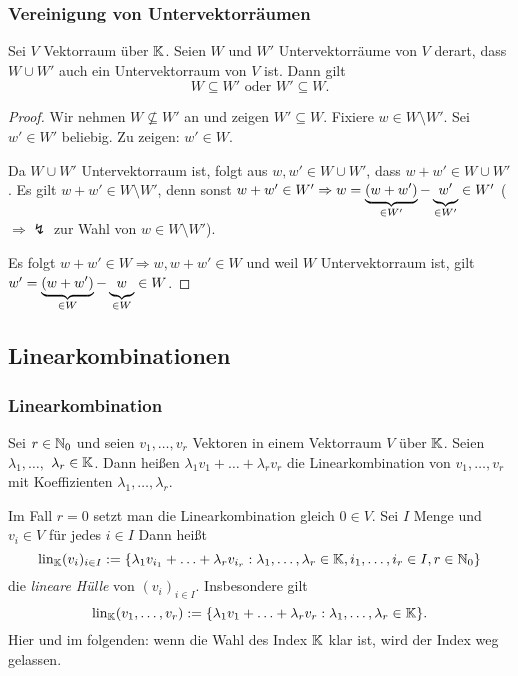 \subsubsection{Vereinigung von Untervektorräumen}
\begin{propn}
	Sei $ V $ Vektorraum über $ \mathbb K $. Seien $ W $ und $ W' $ Untervektorräume von $ V $ derart, dass $ W \cup W' $ auch ein Untervektorraum von $ V $ ist. Dann gilt
	\begin{equation*}
		W \subseteq W' \text{ oder } W' \subseteq W.
	\end{equation*}
\end{propn}
\begin{proof}
	Wir nehmen $ W \not\subseteq W' $ an und zeigen $ W' \subseteq W $. Fixiere $ w \in W \setminus W' $. Sei $ w' \in W' $ beliebig. Zu zeigen: $ w' \in W $.
	
	Da $ W \cup W' $ Untervektorraum ist, folgt aus $ w,w' \in W \cup W' $, dass $ w + w' \in W \cup W' $. Es gilt $ w + w' \in W \setminus W' $, denn sonst $ w+w' \in W' \Rightarrow w = \underbrace{\left( w+w' \right)}_{ \in W'} - \underbrace{\vphantom{\left( w' \right)} w'}_{\in W'} \in W' $ ($ \Rightarrow \lightning $ zur Wahl von $ w \in W \setminus W' $).

	Es folgt $ w+w' \in W \Rightarrow w, w+w' \in W $ und weil $ W $ Untervektorraum ist, gilt $ w' = \underbrace{(w+w')}_{\in W} - \underbrace{\vphantom{\left( w' \right)} w}_{\in W} \in W $.
\end{proof}

\subsection{Linearkombinationen}
\subsubsection{Linearkombination}
Sei $ r \in \mathbb N_0 $ und seien $ v_1, \ldots, v_r $ Vektoren in einem Vektorraum $ V $ über $ \mathbb K $. Seien  $ \lambda_1, \ldots, $ $ \lambda_r \in \mathbb K $. Dann heißen $ \lambda_1 v_1 + \ldots + \lambda_r v_r $ die Linearkombination von $ v_1, \ldots, v_r $ mit Koeffizienten $ \lambda_1, \ldots, \lambda_r $.
	
Im Fall $ r = 0 $ setzt man die Linearkombination gleich $ 0 \in V $. Sei $ I $ Menge und $ v_i \in V $ für jedes $ i \in I $ Dann heißt
\begin{equation}
	\operatorname{lin}_\mathbb K (v_i)_{i \in I} := \{ \lambda_1 v_{i_1} + \ldots + \lambda_r v_{i_r} : \lambda_1, \ldots, \lambda_r \in \mathbb K, i_1, \ldots, i_r \in I, r \in \mathbb N_0 \}
\end{equation}  
die \emph{lineare Hülle} von $ (v_i)_{i \in I} $. Insbesondere gilt
\begin{equation}
	\operatorname{lin}_\mathbb K (v_1, \ldots, v_r) := \{ \lambda_1 v_1 + \ldots + \lambda_r v_r : \lambda_1, \ldots, \lambda_r \in \mathbb K \}.
\end{equation}
Hier und im folgenden: wenn die Wahl des Index $ \mathbb K $ klar ist, wird der Index weg gelassen.

